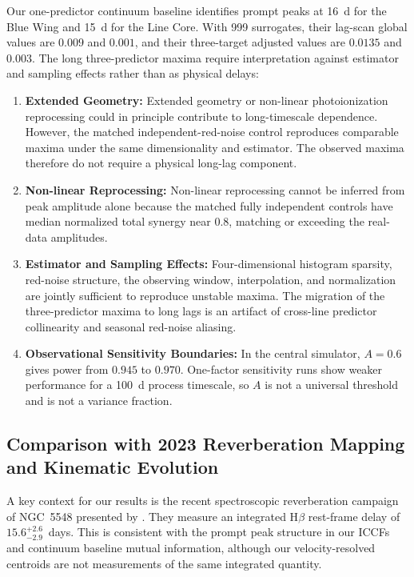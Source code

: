 \documentclass[fleqn,usenatbib]{mnras}
\begin{document}
Our one-predictor continuum baseline identifies prompt peaks at 16~d for the Blue Wing and 15~d for the Line Core. With 999 surrogates, their lag-scan global values are $0.009$ and $0.001$, and their three-target adjusted values are $0.0135$ and $0.003$. The long three-predictor maxima require interpretation against estimator and sampling effects rather than as physical delays:
\begin{enumerate}
\item \textbf{Extended Geometry:} Extended geometry or non-linear photoionization reprocessing could in principle contribute to long-timescale dependence. However, the matched independent-red-noise control reproduces comparable maxima under the same dimensionality and estimator. The observed maxima therefore do not require a physical long-lag component.
\item \textbf{Non-linear Reprocessing:} Non-linear reprocessing cannot be inferred from peak amplitude alone because the matched fully independent controls have median normalized total synergy near 0.8, matching or exceeding the real-data amplitudes.
\item \textbf{Estimator and Sampling Effects:} Four-dimensional histogram sparsity, red-noise structure, the observing window, interpolation, and normalization are jointly sufficient to reproduce unstable maxima. The migration of the three-predictor maxima to long lags is an artifact of cross-line predictor collinearity and seasonal red-noise aliasing.
\item \textbf{Observational Sensitivity Boundaries:} In the central simulator, $A=0.6$ gives power from $0.945$ to $0.970$. One-factor sensitivity runs show weaker performance for a 100~d process timescale, so $A$ is not a universal threshold and is not a variance fraction.
\end{enumerate}

\subsection{Comparison with 2023 Reverberation Mapping and Kinematic Evolution}
\label{sec:comparison_xi}

A key context for our results is the recent spectroscopic reverberation campaign of NGC~5548 presented by \citet{Xi2025}. They measure an integrated H\(\beta\) rest-frame delay of \(15.6_{-2.9}^{+2.6}\)~days. This is consistent with the prompt peak structure in our ICCFs and continuum baseline mutual information, although our velocity-resolved centroids are not measurements of the same integrated quantity.
\end{document}
